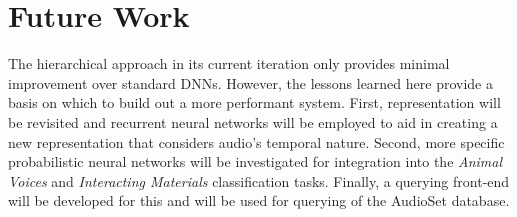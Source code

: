 \section{Future Work}

The hierarchical approach in its current iteration only provides minimal
improvement over standard DNNs. However, the lessons learned here provide a
basis on which to build out a more performant system. First, representation will
be revisited and recurrent neural networks will be employed to aid in creating a
new representation that considers audio's temporal nature. Second, more specific
probabilistic neural networks will be investigated for integration into the
\textit{Animal Voices} and \textit{Interacting Materials} classification tasks.
Finally, a querying front-end will be developed for this and will be used for
querying of the AudioSet database.